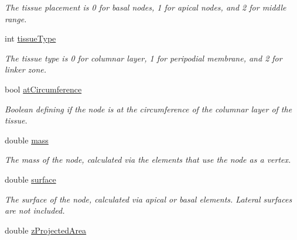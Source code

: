 \begin{DoxyCompactItemize}
\begin{DoxyCompactList}\small\item\em The tissue placement is 0 for basal nodes, 1 for apical nodes, and 2 for middle range. \end{DoxyCompactList}\item 
\hypertarget{classNode_ae621097f98f1d33d283cf65a0a02d29a}{}int \hyperlink{classNode_ae621097f98f1d33d283cf65a0a02d29a}{tissue\+Type}\label{classNode_ae621097f98f1d33d283cf65a0a02d29a}

\begin{DoxyCompactList}\small\item\em The tissue type is 0 for columnar layer, 1 for peripodial membrane, and 2 for linker zone. \end{DoxyCompactList}\item 
\hypertarget{classNode_ab6b225354ad961f2e9bd5d7fe9b67b3a}{}bool \hyperlink{classNode_ab6b225354ad961f2e9bd5d7fe9b67b3a}{at\+Circumference}\label{classNode_ab6b225354ad961f2e9bd5d7fe9b67b3a}

\begin{DoxyCompactList}\small\item\em Boolean defining if the node is at the circumference of the columnar layer of the tissue. \end{DoxyCompactList}\item 
\hypertarget{classNode_a63e510fc9158eb15e751861bc14eae38}{}double \hyperlink{classNode_a63e510fc9158eb15e751861bc14eae38}{mass}\label{classNode_a63e510fc9158eb15e751861bc14eae38}

\begin{DoxyCompactList}\small\item\em The mass of the node, calculated via the elements that use the node as a vertex. \end{DoxyCompactList}\item 
\hypertarget{classNode_aab30ea418838635c21593c47f39f2699}{}double \hyperlink{classNode_aab30ea418838635c21593c47f39f2699}{surface}\label{classNode_aab30ea418838635c21593c47f39f2699}

\begin{DoxyCompactList}\small\item\em The surface of the node, calculated via apical or basal elements. Lateral surfaces are not included. \end{DoxyCompactList}\item 
\hypertarget{classNode_af8e9678dfeffc9e99d925a83b58fde3d}{}double \hyperlink{classNode_af8e9678dfeffc9e99d925a83b58fde3d}{z\+Projected\+Area}\label{classNode_af8e9678dfeffc9e99d925a83b58fde3d}


\end{DoxyCompactItemize}
